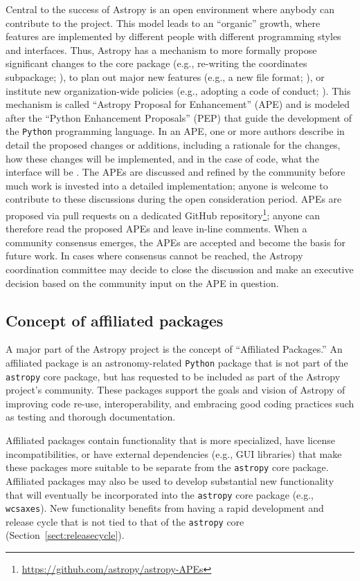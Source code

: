 \documentclass[modern]{aastex61}
\newcommand{\package}[1]{\texttt{#1}\xspace}
\newcommand{\python}{\package{Python}}
\newcommand{\astropy}{Astropy\xspace}
\newcommand{\astropypkg}{\package{astropy}}
\newcommand{\sectionname}{Section\xspace}
\begin{document}
Central to the success of \astropy is an open environment where anybody can
contribute to the project.
This model leads to an ``organic'' growth, where features are
implemented by different people with different programming styles and
interfaces.
Thus, \astropy has a mechanism to more formally propose significant changes to
the core package (e.g., re-writing the coordinates subpackage; \citealt{ape5}),
to plan out major new features (e.g., a new file format; \citealt{ape6}), or
institute new organization-wide policies (e.g., adopting a code of conduct;
\citealt{ape8}).
This mechanism is called ``Astropy Proposal for Enhancement'' (APE) and is
modeled after the ``Python Enhancement Proposals'' (PEP) that guide the
development of the \python programming language.
In an APE, one or more authors describe in detail the proposed changes or
additions, including a rationale for the changes, how these changes will be
implemented, and in the case of code, what the interface will be \citep{ape1}.
The APEs are discussed and refined by the community before much work is invested
into a detailed implementation; anyone is welcome to contribute to these
discussions during the open consideration period. APEs are proposed via pull
requests on a dedicated GitHub repository\footnote{\url{https://github.com/astropy/astropy-APEs}};
anyone can therefore read the proposed APEs and leave in-line comments.
When a community consensus emerges, the APEs are accepted and become
the basis for future work.
In cases where consensus cannot be reached, the
\astropy coordination committee may decide to close the discussion and
make an executive decision based on the community input on the APE in question.


\subsection{Concept of affiliated packages}

A major part of the \astropy project is the concept of ``Affiliated Packages.''
An affiliated package is an astronomy-related
\python package that is not part of the \astropypkg core package, but
has requested to be included as part of the \astropy project's
community. These packages support the goals and vision of \astropy of
improving code re-use, interoperability, and embracing good coding
practices such as testing and thorough documentation.

Affiliated packages contain functionality that is more specialized,
have license incompatibilities, or have external dependencies (e.g., GUI
libraries) that make these packages more suitable to be separate from the
\astropypkg core package.
Affiliated packages may also be used to develop substantial new functionality
that will eventually be incorporated into the \astropypkg core package
(e.g., \texttt{wcsaxes}).
New functionality benefits from having a rapid development and release cycle that is not tied to that of the \astropypkg core (\sectionname~\ref{sect:releasecycle}).
\end{document}
